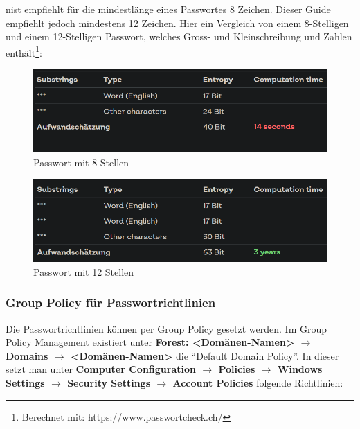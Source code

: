 \acrshort{nist} empfiehlt für die mindestlänge eines Passwortes 8 Zeichen.
Dieser Guide empfiehlt jedoch mindestens 12 Zeichen.
Hier ein Vergleich von einem 8-Stelligen und einem 12-Stelligen Passwort, welches Gross- und Kleinschreibung und Zahlen enthält\footnote{Berechnet mit: https://www.passwortcheck.ch/}:\\
\begin{minipage}{0.5\linewidth}
    \begin{figure}[H]
        \centering
        \includegraphics[width=\linewidth]{../img/IAM/8-characters.png}
        \caption{Passwort mit 8 Stellen}
    \end{figure}
\end{minipage}
\begin{minipage}{0.5\linewidth}
    \begin{figure}[H]
        \centering
        \includegraphics[width=\linewidth]{../img/IAM/12-characters.png}
        \caption{Passwort mit 12 Stellen}
    \end{figure}
\end{minipage}
\subsubsection{Group Policy für Passwortrichtlinien}
Die Passwortrichtlinien können per Group Policy gesetzt werden.
Im Group Policy Management existiert unter \textbf{Forest: <Domänen-Namen> $\rightarrow$ Domains $\rightarrow$ <Domänen-Namen>} die ``Default Domain Policy''.
In dieser setzt man unter \textbf{Computer Configuration $\rightarrow$ Policies $\rightarrow$ Windows Settings $\rightarrow$ Security Settings $\rightarrow$ Account Policies} folgende Richtlinien:\\

